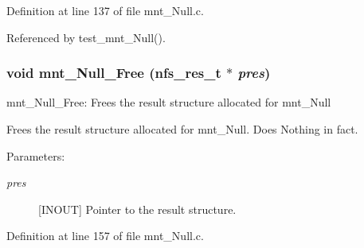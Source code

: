 Definition at line 137 of file mnt\_\-Null.c.

Referenced by test\_\-mnt\_\-Null().
\subsubsection{\setlength{\rightskip}{0pt plus 5cm}void mnt\_\-Null\_\-Free (nfs\_\-res\_\-t $\ast$ {\em pres})}\label{mnt__Null_8c_a1}


mnt\_\-Null\_\-Free: Frees the result structure allocated for mnt\_\-Null

Frees the result structure allocated for mnt\_\-Null. Does Nothing in fact.

\begin{Desc}
\item[Parameters:]
\begin{description}
\item[{\em pres}][INOUT] Pointer to the result structure. \end{description}
\end{Desc}


Definition at line 157 of file mnt\_\-Null.c.